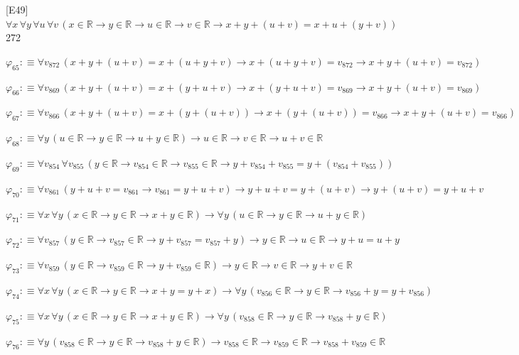 \begin{fullproof}{[E49]}{$\forall x\,\forall y\,\forall u\,\forall v\,(x \in \mathbb{R} \to y \in \mathbb{R} \to u \in \mathbb{R} \to v \in \mathbb{R} \to x + y + (u + v) = x + u + (y + v))$}{272}
\begin{abbrevlist}
\item $\varphi_{65} :\equiv \forall v_{872}\,(x + y + (u + v) = x + (u + y + v) \to x + (u + y + v) = v_{872} \to x + y + (u + v) = v_{872})$
\item $\varphi_{66} :\equiv \forall v_{869}\,(x + y + (u + v) = x + (y + u + v) \to x + (y + u + v) = v_{869} \to x + y + (u + v) = v_{869})$
\item $\varphi_{67} :\equiv \forall v_{866}\,(x + y + (u + v) = x + (y + (u + v)) \to x + (y + (u + v)) = v_{866} \to x + y + (u + v) = v_{866})$
\item $\varphi_{68} :\equiv \forall y\,(u \in \mathbb{R} \to y \in \mathbb{R} \to u + y \in \mathbb{R}) \to u \in \mathbb{R} \to v \in \mathbb{R} \to u + v \in \mathbb{R}$
\item $\varphi_{69} :\equiv \forall v_{854}\,\forall v_{855}\,(y \in \mathbb{R} \to v_{854} \in \mathbb{R} \to v_{855} \in \mathbb{R} \to y + v_{854} + v_{855} = y + (v_{854} + v_{855}))$
\item $\varphi_{70} :\equiv \forall v_{861}\,(y + u + v = v_{861} \to v_{861} = y + u + v) \to y + u + v = y + (u + v) \to y + (u + v) = y + u + v$
\item $\varphi_{71} :\equiv \forall x\,\forall y\,(x \in \mathbb{R} \to y \in \mathbb{R} \to x + y \in \mathbb{R}) \to \forall y\,(u \in \mathbb{R} \to y \in \mathbb{R} \to u + y \in \mathbb{R})$
\item $\varphi_{72} :\equiv \forall v_{857}\,(y \in \mathbb{R} \to v_{857} \in \mathbb{R} \to y + v_{857} = v_{857} + y) \to y \in \mathbb{R} \to u \in \mathbb{R} \to y + u = u + y$
\item $\varphi_{73} :\equiv \forall v_{859}\,(y \in \mathbb{R} \to v_{859} \in \mathbb{R} \to y + v_{859} \in \mathbb{R}) \to y \in \mathbb{R} \to v \in \mathbb{R} \to y + v \in \mathbb{R}$
\item $\varphi_{74} :\equiv \forall x\,\forall y\,(x \in \mathbb{R} \to y \in \mathbb{R} \to x + y = y + x) \to \forall y\,(v_{856} \in \mathbb{R} \to y \in \mathbb{R} \to v_{856} + y = y + v_{856})$
\item $\varphi_{75} :\equiv \forall x\,\forall y\,(x \in \mathbb{R} \to y \in \mathbb{R} \to x + y \in \mathbb{R}) \to \forall y\,(v_{858} \in \mathbb{R} \to y \in \mathbb{R} \to v_{858} + y \in \mathbb{R})$
\item $\varphi_{76} :\equiv \forall y\,(v_{858} \in \mathbb{R} \to y \in \mathbb{R} \to v_{858} + y \in \mathbb{R}) \to v_{858} \in \mathbb{R} \to v_{859} \in \mathbb{R} \to v_{858} + v_{859} \in \mathbb{R}$

\end{abbrevlist}
\end{fullproof}
